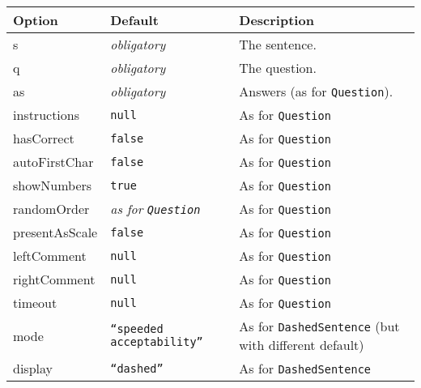 \documentclass[11pt,letterpaper]{article}
\begin{document}
\footnotesize
\begin{RaggedRight}
\sloppy
\begin{tabular}{|p{1.2181in}|p{1.4285in}|p{2.8534in}|}
\hline
 \textbf{Option}          &  \textbf{Default}                  &  \textbf{Description}                                        \\
\hline
 s                 & \textit{ obligatory}                &  The sentence.                                        \\
\hline
 q                 & \textit{ obligatory}                &  The question.                                        \\
\hline
 as                & \textit{ obligatory}                &  Answers (as for \texttt{Question}).                         \\
\hline
 instructions      &  \texttt{null}                     &  As for \texttt{Question}                                    \\
\hline
 hasCorrect        &  \texttt{false}                    &  As for \texttt{Question}                                    \\
\hline
 autoFirstChar     &  \texttt{false}                    &  As for \texttt{Question}                                    \\
\hline
 showNumbers       &  \texttt{true}                     &  As for \texttt{Question}                                    \\
\hline
 randomOrder       & \textit{ as for }\textit{\texttt{Question}}\textit{}         &  As for \texttt{Question}                                    \\
\hline
 presentAsScale    &  \texttt{false}                    &  As for \texttt{Question}                                    \\
\hline
 leftComment       &  \texttt{null}                     &  As for \texttt{Question}                                    \\
\hline
 rightComment      &  \texttt{null}                     &  As for \texttt{Question}                                    \\
\hline
 timeout           &  \texttt{null}                     &  As for \texttt{Question}                                    \\
\hline
 mode              &  \texttt{``speeded acceptability''}  &  As for \texttt{DashedSentence} (but with different default) \\
\hline
 display           &  \texttt{``dashed''}                 &  As for \texttt{DashedSentence}                              \\

\end{tabular}
\end{RaggedRight}
\end{document}
